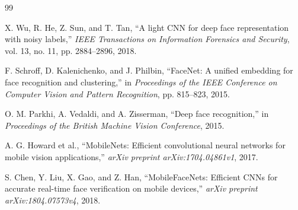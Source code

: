 \documentclass[11pt,a4paper,twocolumn]{article}
\begin{document}
\begin{thebibliography}{99}

%

X. Wu, R. He, Z. Sun, and T. Tan,
``A light CNN for deep face representation with noisy labels,''
\textit{IEEE Transactions on Information Forensics and Security},
vol. 13, no. 11, pp. 2884--2896, 2018.

F. Schroff, D. Kalenichenko, and J. Philbin,
``FaceNet: A unified embedding for face recognition and clustering,''
in \textit{Proceedings of the IEEE Conference on Computer Vision and Pattern Recognition},
pp. 815--823, 2015.

O. M. Parkhi, A. Vedaldi, and A. Zisserman,
``Deep face recognition,''
in \textit{Proceedings of the British Machine Vision Conference},
2015.

A. G. Howard et al.,
``MobileNets: Efficient convolutional neural networks for mobile vision applications,''
\textit{arXiv preprint arXiv:1704.04861v1}, 2017.

S. Chen, Y. Liu, X. Gao, and Z. Han,
``MobileFaceNets: Efficient CNNs for accurate real-time face verification on mobile devices,''
\textit{arXiv preprint arXiv:1804.07573v4}, 2018.

\end{thebibliography}
\end{document}
